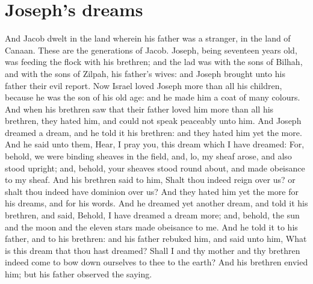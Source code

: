 \section*{Joseph's dreams}
\begin{biblechapter} %
\verse And Jacob dwelt in the land wherein his father was a stranger, in the land of Canaan.
\verse These are the generations of Jacob. Joseph, being seventeen years old, was feeding the flock with his brethren; and the lad was with the sons of Bilhah, and with the sons of Zilpah, his father's wives: and Joseph brought unto his father their evil report.
\verse Now Israel loved Joseph more than all his children, because he was the son of his old age: and he made him a coat of many colours.
\verse And when his brethren saw that their father loved him more than all his brethren, they hated him, and could not speak peaceably unto him.
\verse And Joseph dreamed a dream, and he told it his brethren: and they hated him yet the more.
\verse And he said unto them, Hear, I pray you, this dream which I have dreamed:
\verse For, behold, we were binding sheaves in the field, and, lo, my sheaf arose, and also stood upright; and, behold, your sheaves stood round about, and made obeisance to my sheaf.
\verse And his brethren said to him, Shalt thou indeed reign over us? or shalt thou indeed have dominion over us? And they hated him yet the more for his dreams, and for his words.
\verse And he dreamed yet another dream, and told it his brethren, and said, Behold, I have dreamed a dream more; and, behold, the sun and the moon and the eleven stars made obeisance to me.
\verse And he told it to his father, and to his brethren: and his father rebuked him, and said unto him, What is this dream that thou hast dreamed? Shall I and thy mother and thy brethren indeed come to bow down ourselves to thee to the earth?
\verse And his brethren envied him; but his father observed the saying.

\end{biblechapter}
